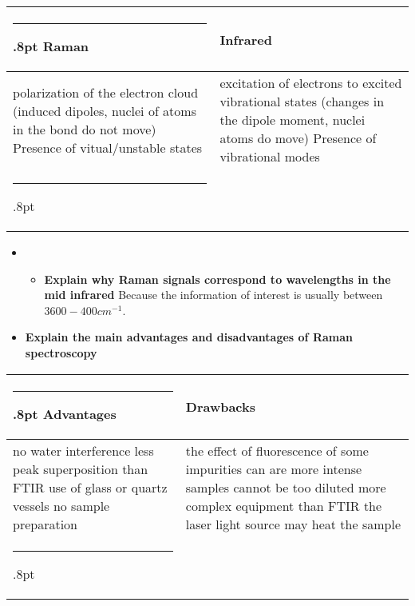 \documentclass[11pt]{article}
\makeatletter
\def\hlinewd#1{%
  \noalign{\ifnum0=`}\fi\hrule \@height #1%
  \futurelet\reserved@a\@xhline}
\def\tbltoprule{\hlinewd{.8pt}}%
\def\tblbottomrule{\hlinewd{.8pt}}
\def\tblmidrule{\hline\noalign{\vspace*{2pt}}}
\makeatother
\begin{document}
\begin{table*}[!htbp]
\def\arraystretch{1}
\ignorespaces 
\centering 
\begin{tabulary}{\linewidth}{LL}
\tbltoprule Raman & Infrared\\
\tblmidrule 
polarization of the electron cloud (induced dipoles, nuclei of atoms in the bond do not move) \mbox{}\protect\newline Presence of vitual/unstable states &
  excitation of electrons to excited vibrational states (changes in the dipole moment, nuclei atoms do move) \mbox{}\protect\newline Presence of vibrational modes\\
\tblbottomrule 
\end{tabulary}\par 
\end{table*}


\begin{itemize}
  \item \relax 

\begin{itemize}
  \item \relax \textbf{ Explain why Raman signals correspond to wavelengths in the mid infrared} \mbox{}\protect\newline * Because the information of interest is usually between $3600 - 400 cm^{-1} $. \mbox{}\protect\newline 
\end{itemize}
  
  \item \relax \textbf{Explain the main advantages and disadvantages of Raman spectroscopy}
\end{itemize}
  
\begin{table*}[!htbp]
\def\arraystretch{1}
\ignorespaces 
\centering 
\begin{tabulary}{\linewidth}{LL}
\tbltoprule Advantages & Drawbacks\\
\tblmidrule 
no water interference \mbox{}\protect\newline less peak superposition than FTIR \mbox{}\protect\newline use of glass or quartz vessels \mbox{}\protect\newline no sample preparation &
  the effect of fluorescence of some impurities can are more intense \mbox{}\protect\newline samples cannot be too diluted \mbox{}\protect\newline more complex equipment than FTIR \mbox{}\protect\newline the laser light source may heat the sample \\
\tblbottomrule 
\end{tabulary}\par 
\end{table*}
\end{document}
